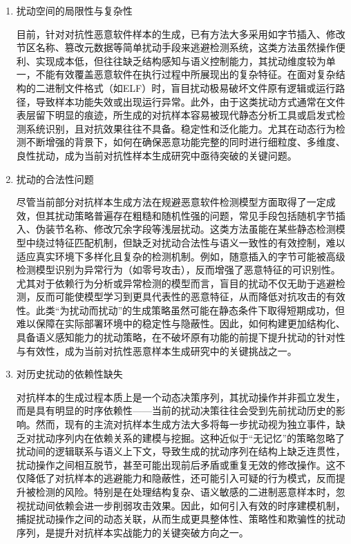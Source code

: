 \begin{enumerate} [label=\arabic*)] 

\item 扰动空间的局限性与复杂性

目前，针对对抗性恶意软件样本的生成，已有方法大多采用如字节插入、修改节区名称、篡改元数据等简单扰动手段来逃避检测系统，这类方法虽然操作便利、实现成本低，但往往缺乏结构感知与语义控制能力，其扰动维度较为单一，不能有效覆盖恶意软件在执行过程中所展现出的复杂特征。在面对复杂结构的二进制文件格式（如ELF）时，盲目扰动极易破坏文件原有逻辑或运行路径，导致样本功能失效或出现运行异常。此外，由于这类扰动方式通常在文件表层留下明显的痕迹，所生成的对抗样本容易被现代静态分析工具或启发式检测系统识别，且对抗效果往往不具备。稳定性和泛化能力。尤其在动态行为检测不断增强的背景下，如何在确保恶意功能完整的同时进行细粒度、多维度、良性扰动，成为当前对抗性样本生成研究中亟待突破的关键问题。


\item 扰动的合法性问题

尽管当前部分对抗样本生成方法在规避恶意软件检测模型方面取得了一定成效，但其扰动策略普遍存在粗糙和随机性强的问题，常见手段包括随机字节插入、伪装节名称、修改冗余字段等浅层扰动。这类方法虽能在某些静态检测模型中绕过特征匹配机制，但缺乏对扰动合法性与语义一致性的有效控制，难以适应真实环境下多样化且复杂的检测机制。例如，随意插入的字节可能被高级检测模型识别为异常行为（如零号攻击），反而增强了恶意特征的可识别性。尤其对于依赖行为分析或异常检测的模型而言，盲目的扰动不仅无助于逃避检测，反而可能使模型学习到更具代表性的恶意特征，从而降低对抗攻击的有效性。此类“为扰动而扰动”的生成策略虽然可能在静态条件下取得短期成功，但难以保障在实际部署环境中的稳定性与隐蔽性。因此，如何构建更加结构化、具备语义感知能力的扰动策略，在不破坏原有功能的前提下提升扰动的针对性与有效性，成为当前对抗性恶意样本生成研究中的关键挑战之一。

\item 对历史扰动的依赖性缺失

对抗样本的生成过程本质上是一个动态决策序列，其扰动操作并非孤立发生，而是具有明显的时序依赖性——当前的扰动决策往往会受到先前扰动历史的影响。然而，现有的主流对抗样本生成方法大多将每一步扰动视为独立事件，缺乏对扰动序列内在依赖关系的建模与挖掘。这种近似于“无记忆”的策略忽略了扰动间的逻辑联系与语义上下文，导致生成的扰动序列在结构上缺乏连贯性，扰动操作之间相互脱节，甚至可能出现前后矛盾或重复无效的修改操作。这不仅降低了对抗样本的逃避能力和隐蔽性，还可能引入可疑的行为模式，反而提升被检测的风险。特别是在处理结构复杂、语义敏感的二进制恶意样本时，忽视扰动间依赖会进一步削弱攻击效果。因此，如何引入有效的时序建模机制，捕捉扰动操作之间的动态关联，从而生成更具整体性、策略性和欺骗性的扰动序列，是提升对抗样本实战能力的关键突破方向之一。


\end{enumerate}
